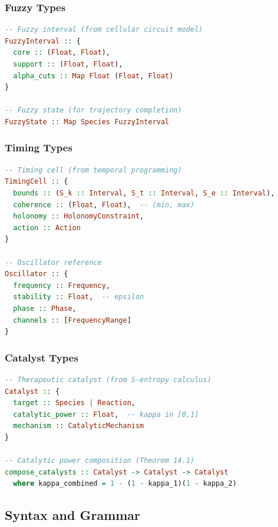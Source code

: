 \documentclass[12pt,a4paper]{article}
\begin{document}
\subsubsection{Fuzzy Types}

\begin{lstlisting}[language=Haskell, basicstyle=\ttfamily\small]
-- Fuzzy interval (from cellular circuit model)
FuzzyInterval :: {
  core :: (Float, Float),
  support :: (Float, Float),
  alpha_cuts :: Map Float (Float, Float)
}

-- Fuzzy state (for trajectory completion)
FuzzyState :: Map Species FuzzyInterval
\end{lstlisting}

\subsubsection{Timing Types}

\begin{lstlisting}[language=Haskell, basicstyle=\ttfamily\small]
-- Timing cell (from temporal programming)
TimingCell :: {
  bounds :: (S_k :: Interval, S_t :: Interval, S_e :: Interval),
  coherence :: (Float, Float),  -- (min, max)
  holonomy :: HolonomyConstraint,
  action :: Action
}

-- Oscillator reference
Oscillator :: {
  frequency :: Frequency,
  stability :: Float,  -- epsilon
  phase :: Phase,
  channels :: [FrequencyRange]
}
\end{lstlisting}

\subsubsection{Catalyst Types}

\begin{lstlisting}[language=Haskell, basicstyle=\ttfamily\small]
-- Therapeutic catalyst (from S-entropy calculus)
Catalyst :: {
  target :: Species | Reaction,
  catalytic_power :: Float,  -- kappa in [0,1]
  mechanism :: CatalyticMechanism
}

-- Catalytic power composition (Theorem 14.1)
compose_catalysts :: Catalyst -> Catalyst -> Catalyst
  where kappa_combined = 1 - (1 - kappa_1)(1 - kappa_2)
\end{lstlisting}

\subsection{Syntax and Grammar}
\end{document}

